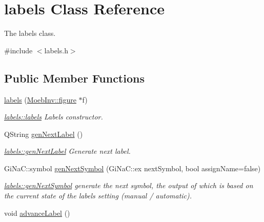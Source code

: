 \hypertarget{classlabels}{}\section{labels Class Reference}
\label{classlabels}


The labels class.  




{\ttfamily \#include $<$labels.\+h$>$}

\subsection*{Public Member Functions}
\begin{DoxyCompactItemize}
\item 
\mbox{\label{classlabels_a736d8b54b76c622c6ff937cd2cbdd767}} 
\mbox{\hyperlink{classlabels_a736d8b54b76c622c6ff937cd2cbdd767}{labels}} (\mbox{\hyperlink{class_moeb_inv_1_1figure}{Moeb\+Inv\+::figure}} $\ast$f)
\begin{DoxyCompactList}\small\item\em \mbox{\hyperlink{classlabels_a736d8b54b76c622c6ff937cd2cbdd767}{labels\+::labels}} Labels constructor. \end{DoxyCompactList}\item 
Q\+String \mbox{\hyperlink{classlabels_a70a7436dbef91e342fec4ec3130187e2}{gen\+Next\+Label}} ()
\begin{DoxyCompactList}\small\item\em \mbox{\hyperlink{classlabels_a70a7436dbef91e342fec4ec3130187e2}{labels\+::gen\+Next\+Label}} Generate next label. \end{DoxyCompactList}\item 
Gi\+Na\+C\+::symbol \mbox{\hyperlink{classlabels_aac459cce2911a18cf66175a6ccfb87f3}{gen\+Next\+Symbol}} (Gi\+Na\+C\+::ex next\+Symbol, bool assign\+Name=false)
\begin{DoxyCompactList}\small\item\em \mbox{\hyperlink{classlabels_aac459cce2911a18cf66175a6ccfb87f3}{labels\+::gen\+Next\+Symbol}} generate the next symbol, the output of which is based on the current state of the labels setting (manual / automatic). \end{DoxyCompactList}\item 
\mbox{\label{classlabels_a790344f0c86546b9b5fdda30dbe690a5}} 
void \mbox{\hyperlink{classlabels_a790344f0c86546b9b5fdda30dbe690a5}{advance\+Label}} ()

\end{DoxyCompactItemize}
